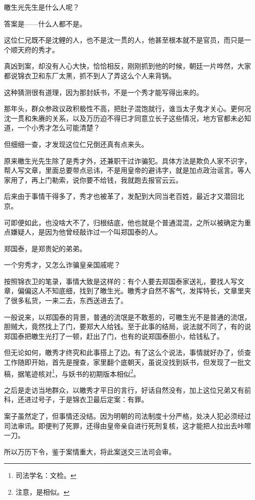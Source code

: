 \begin{multicols}{\theparacolNo}
皦生光先生是什么人呢？

答案是——什么人都不是。

这位仁兄既不是沈鲤的人，也不是沈一贯的人，他甚至根本就不是官员，而只是一个顺天府的秀才。

真凶到案，却没有人心大快，恰恰相反，刚刚抓到他的时候，朝廷一片哗然，大家都说锦衣卫和东厂太黑，抓不到人了弄这么个人来背锅。

这种猜测很有道理，因为那封妖书，不是一个秀才能写得出来的。

那年头，群众参政议政积极性不高，把肚子混饱就行，谁当太子鬼才关心。更何况沈一贯和朱赓的关系，以及万历迫不得已才同意立长子这些情况，地方官都未必知道，一个小秀才怎么可能清楚？

但细细一查，才发现这位仁兄倒还真有点来头。

原来皦生光先生除了是秀才外，还兼职干过诈骗犯。具体方法是欺负人家不识字，帮人写文章，里面总要带点忌讳，不是用皇帝的避讳字，就是加点政治谣言。等人家用了，再上门勒索，说你要不给钱，我就跑去报官云云。

后来由于事情干得多了，秀才也被革了，发配到大同当老百姓，最近才又潜回北京。

可即便如此，也没啥大不了，归根结底，他也就是个普通混混，之所以被确定为重点嫌疑人，是因为他曾经敲诈过一个叫郑国泰的人。

郑国泰，是郑贵妃的弟弟。

一个穷秀才，又怎么诈骗皇亲国戚呢？

按照锦衣卫的笔录，事情大致是这样的：有个人要去郑国泰家送礼，要找人写文章，偏偏这人不知底细，找到了皦生光。皦秀才自然不客气，发挥特长，文章里夹了很多私货，一来二去，东西送进去了。

一般说来，以郑国泰的背景，普通的流氓是不敢惹的，可皦生光不是普通的流氓，胆贼大，竟然找上了门，要郑大人给钱。至于此事的结局，说法就不同了，有的说郑国泰把皦生光打了一顿，赶出了门，也有的说郑国泰胆小，给钱私了。

但无论如何，皦秀才终究和此事搭上了边。有了这么个说法，事情就好办了，侦查工作随即开始，首先是搜查，家里翻个底朝天，虽说没找到妖书，但发现了一批文稿，据笔迹核对\footnote{司法学名：文检。}，与妖书的初期版本相似\footnote{注意，是相似。}。

之后是走访当地群众，以皦秀才平日的言行，好话自然没有，加上这位兄弟又有前科，还进过号子，于是锦衣卫最后定案：有罪。

案子虽然定了，但事情还没结。因为明朝的司法制度十分严格，处决人犯必须经过司法审讯。即便判了死罪，还得由皇帝亲自进行死刑复核，这才能把人拉出去咔嚓一刀。

所以万历下令，鉴于案情重大，将此案送交三法司会审。


\end{multicols}
